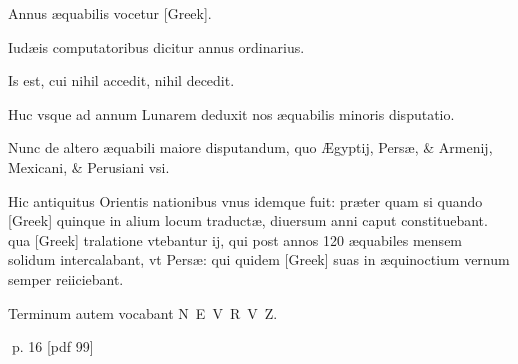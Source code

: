 \begin{parnumbers}
Annus æquabilis vocetur \textgreek{[Greek]}.

Iudæis computatoribus  dicitur annus ordinarius.

Is est, cui nihil accedit, nihil decedit.

Huc vsque ad annum Lunarem deduxit nos æquabilis minoris disputatio.

Nunc de altero æquabili maiore disputandum, quo Ægyptij, Persæ, \& Armenij, Mexicani, \& Perusiani vsi.

Hic antiquitus Orientis nationibus vnus idemque fuit: præter quam si quando \textgreek{[Greek]} quinque in alium locum traductæ, diuersum anni caput constituebant. qua \textgreek{[Greek]} tralatione vtebantur ij, qui post annos 120 æquabiles mensem solidum intercalabant, vt Persæ: qui quidem \textgreek{[Greek]} suas in æquinoctium vernum semper reiiciebant.

Terminum autem vocabant N E V R V Z.
\end{parnumbers}
\clearpage
p. 16 [pdf 99]

